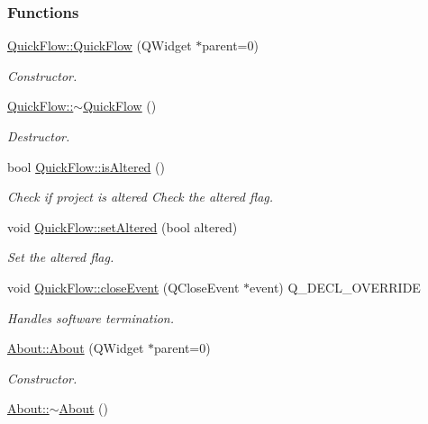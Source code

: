 \subsubsection*{Functions}
\begin{DoxyCompactItemize}
\item 
\hyperlink{group___window_ga7689e2608835392fce3f4c95a7a542db}{Quick\+Flow\+::\+Quick\+Flow} (Q\+Widget $\ast$parent=0)
\begin{DoxyCompactList}\small\item\em Constructor. \end{DoxyCompactList}\item 
\hyperlink{group___window_ga985823a0db64246b3a15eed2f397e0a4}{Quick\+Flow\+::$\sim$\+Quick\+Flow} ()
\begin{DoxyCompactList}\small\item\em Destructor. \end{DoxyCompactList}\item 
bool \hyperlink{group___window_ga5d9148467ef65c48419bf020ee107a45}{Quick\+Flow\+::is\+Altered} ()
\begin{DoxyCompactList}\small\item\em Check if project is altered Check the altered flag. \end{DoxyCompactList}\item 
void \hyperlink{group___window_ga4b63ea5ca52a9eea14db0a22b5a133f8}{Quick\+Flow\+::set\+Altered} (bool altered)
\begin{DoxyCompactList}\small\item\em Set the altered flag. \end{DoxyCompactList}\item 
void \hyperlink{group___window_gac8cc1bb329961a0781ffed7b6f2ab402}{Quick\+Flow\+::close\+Event} (Q\+Close\+Event $\ast$event) Q\+\_\+\+D\+E\+C\+L\+\_\+\+O\+V\+E\+R\+R\+I\+D\+E
\begin{DoxyCompactList}\small\item\em Handles software termination. \end{DoxyCompactList}\item 
\hyperlink{group___window_gab79599ebbcdeffe0a96e00f010e64177}{About\+::\+About} (Q\+Widget $\ast$parent=0)
\begin{DoxyCompactList}\small\item\em Constructor. \end{DoxyCompactList}\item 
\hyperlink{group___window_gace60197b1b610998908036ee1f802204}{About\+::$\sim$\+About} ()

\end{DoxyCompactItemize}
